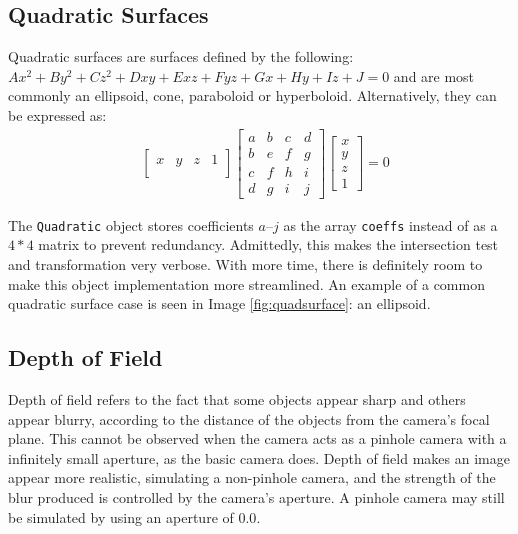 \documentclass[a4paper]{article}
\begin{document}
\subsection{Quadratic Surfaces}
Quadratic surfaces are surfaces defined by the following: $ Ax^{2}+By^{2}+Cz^{2}+Dxy+Exz+Fyz+Gx+Hy+Iz+J=0 $ and are most commonly an ellipsoid, cone, paraboloid or hyperboloid. Alternatively, they can be expressed as:
\begin{align*}
    &
    \begin{bmatrix}
        x & y & z & 1 \\
    \end{bmatrix}
    \begin{bmatrix}
        a & b & c & d \\
        b & e & f & g \\
        c & f & h & i \\
        d & g & i & j 
    \end{bmatrix}
    \begin{bmatrix}
        x \\
        y \\
        z \\
        1
    \end{bmatrix} = 0
\end{align*}

The \texttt{Quadratic} object stores coefficients $a$--$j$ as the array \texttt{coeffs} instead of as a $4*4$ matrix to prevent redundancy. Admittedly, this makes the intersection test and transformation very verbose. With more time, there is definitely room to make this object implementation more streamlined. An example of a common quadratic surface case is seen in Image \ref{fig:quadsurface}: an ellipsoid.

\subsection{Depth of Field}\label{ss:depthoffield}
Depth of field refers to the fact that some objects appear sharp and others appear blurry, according to the distance of the objects from the camera's focal plane. This cannot be observed when the camera acts as a pinhole camera with a infinitely small aperture, as the basic camera does. Depth of field makes an image appear more realistic, simulating a non-pinhole camera, and the strength of the blur produced is controlled by the camera's aperture. A pinhole camera may still be simulated by using an aperture of $0.0$.
\end{document}

